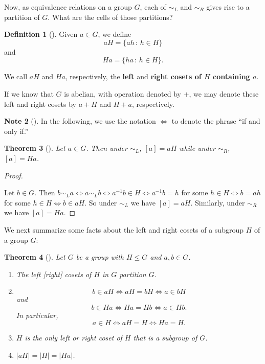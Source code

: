 \documentclass[10pt,]{book}
\newcommand{\terminology}[1]{\textbf{#1}}
\theoremstyle{plain}
\newtheorem{theorem}{Theorem}[section]
\theoremstyle{definition}
\newtheorem{definition}[theorem]{Definition}
\theoremstyle{definition}
\newtheorem{note}[theorem]{Note}
\theoremstyle{definition}
\theoremstyle{definition}
\numberwithin{equation}{section}
\def\siml{\sim_L}
\def\simr{\sim_R}
\begin{document}
\par
Now, as equivalence relations on a group \(G\), each of \(\siml\) and \(\simr\) gives rise to a partition of \(G\). What are the cells of those partitions?%
\begin{definition}[{}]\label{definition-62}
\label{notation-68}
\label{notation-69}
Given \(a\in G\), we define%
\begin{equation*}
aH =
\{ah\,:\, h\in H\}
\end{equation*}
and%
\begin{equation*}
Ha=\{ha\,:\,h\in H\}.
\end{equation*}
%
\par
We call \(aH\) and \(Ha\), respectively, the \terminology{left} and \terminology{right cosets of \(H\) containing \(a\)}.%
\par
If we know that \(G\) is abelian, with operation denoted by \(+\), we may denote these left and right cosets by \(a+H\) and \(H+a\), respectively.%
\end{definition}
\begin{note}[]\label{note-8}
\label{notation-70}
 In the following, we use the notation \(\Leftrightarrow\) to denote the phrase ``if and only if.''%
\end{note}
\begin{theorem}[{}]\label{equivca}
Let \(a\in G\). Then under \(\siml\), \([a]=aH\) while under \(\simr\), \([a]=Ha\).%
\end{theorem}
\begin{proof}\hypertarget{proof-42}{}
Let \(b\in G\). Then \(b\siml a \Leftrightarrow a \siml b
\Leftrightarrow a^{-1}b\in H \Leftrightarrow a^{-1}b=h\) for some \(h\in H \Leftrightarrow b=ah\) for some \(h\in H \Leftrightarrow b\in
aH\). So under \(\siml\) we have \([a]=aH\). Similarly, under \(\simr\) we have \([a]=Ha\).%
\end{proof}
We next summarize some facts about the left and right cosets of a subgroup \(H\) of a group \(G\):%
\begin{theorem}[{}]\label{cosetfacts}
Let \(G\) be a group with \(H\leq G\) and \(a,b\in G\). \leavevmode%
\begin{enumerate}
\item\hypertarget{li-408}{}The left [right] cosets of \(H\) in \(G\) partition \(G\).%
\item\hypertarget{li-409}{}%
\begin{equation*}
b\in aH \Leftrightarrow aH=bH \Leftrightarrow  a\in bH
\end{equation*}
and%
\begin{equation*}
b\in Ha \Leftrightarrow  Ha=Hb \Leftrightarrow  a\in
Hb.
\end{equation*}
In particular,%
\begin{equation*}
a\in H \Leftrightarrow aH=H \Leftrightarrow Ha=H.
\end{equation*}
%
\item\hypertarget{li-410}{}\(H\) is the only left or right coset of \(H\) that is a \emph{subgroup} of \(G\).%
\item\hypertarget{li-411}{}\(|aH|=|H|=|Ha|\).%
\end{enumerate}
%
\end{theorem}
\end{document}

